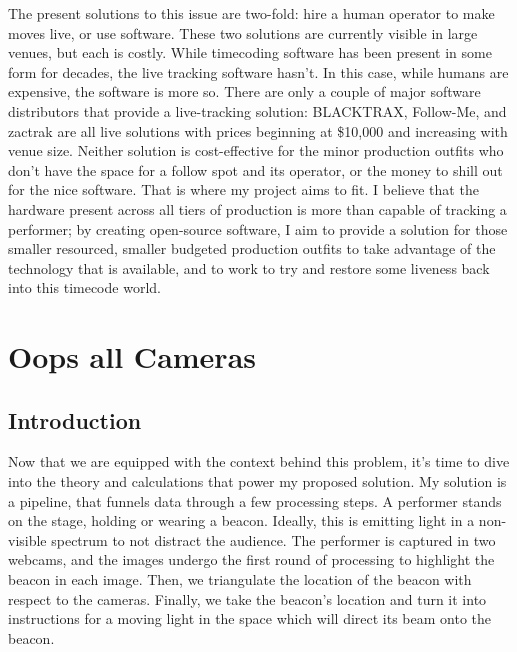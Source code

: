 \documentclass[
    12pt,
    twoside,
    bibstyle=chicago,
    headerstyle=uppercase,
	bibfile=biblatex_updating.bib
]{reedthesis}
\begin{document}
The present solutions to this issue are two-fold: hire a human operator to make moves live, or use software. These two solutions are currently visible in large venues, but each is costly. While timecoding software has been present in some form for decades, the live tracking software hasn't. In this case, while humans are expensive, the software is more so. There are only a couple of major software distributors that provide a live-tracking solution: BLACKTRAX, Follow-Me, and zactrak are all live solutions with prices beginning at \$10,000 and increasing with venue size. Neither solution is cost-effective for the minor production outfits who don't have the space for a follow spot and its operator, or the money to shill out for the nice software. That is where my project aims to fit. I believe that the hardware present across all tiers of production is more than capable of tracking a performer; by creating open-source software, I aim to provide a solution for those smaller resourced, smaller budgeted production outfits to take advantage of the technology that is available, and to work to try and restore some liveness back into this timecode world.


\chapter{Oops all Cameras}


\section{Introduction}


Now that we are equipped with the context behind this problem, it's time to dive into the theory and calculations that power my proposed solution. My solution is a pipeline, that funnels data through a few processing steps. A performer stands on the stage, holding or wearing a beacon. Ideally, this is emitting light in a non-visible spectrum to not distract the audience. The performer is captured in two webcams, and the images undergo the first round of processing to highlight the beacon in each image. Then, we triangulate the location of the beacon with respect to the cameras. Finally, we take the beacon's location and turn it into instructions for a moving light in the space which will direct its beam onto the beacon.
\end{document}
